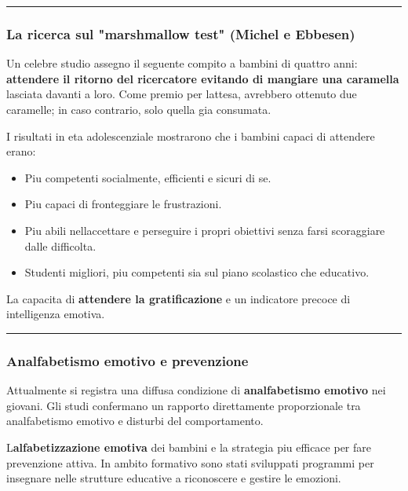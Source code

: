 \documentclass[a4paper,11pt]{article}
\providecommand{\tightlist}{%
  \setlength{\itemsep}{0pt}\setlength{\parskip}{0pt}}
\begin{document}
\begin{center}\rule{0.5\linewidth}{0.5pt}\end{center}

\subsubsection{La ricerca sul "marshmallow test" (Michel e
      Ebbesen)}\label{la-ricerca-sul-marshmallow-test-michel-e-ebbesen}

Un celebre studio assegno il seguente compito a bambini di quattro anni:
\textbf{attendere il ritorno del ricercatore evitando di mangiare una
      caramella} lasciata davanti a loro. Come premio per
l\textquotesingle attesa, avrebbero ottenuto due caramelle; in caso
contrario, solo quella gia consumata.

I risultati in eta adolescenziale mostrarono che i bambini capaci di
attendere erano:

\begin{itemize}
      \tightlist
      \item
            Piu competenti socialmente, efficienti e sicuri di se.
      \item
            Piu capaci di fronteggiare le frustrazioni.
      \item
            Piu abili nell\textquotesingle accettare e perseguire i propri
            obiettivi senza farsi scoraggiare dalle difficolta.
      \item
            Studenti migliori, piu competenti sia sul piano scolastico che
            educativo.
\end{itemize}

La capacita di \textbf{attendere la gratificazione} e un indicatore
precoce di intelligenza emotiva.

\begin{center}\rule{0.5\linewidth}{0.5pt}\end{center}

\subsubsection{Analfabetismo emotivo e
      prevenzione}\label{analfabetismo-emotivo-e-prevenzione}

Attualmente si registra una diffusa condizione di \textbf{analfabetismo
      emotivo} nei giovani. Gli studi confermano un rapporto direttamente
proporzionale tra analfabetismo emotivo e disturbi del comportamento.

L\textquotesingle{}\textbf{alfabetizzazione emotiva} dei bambini e la
strategia piu efficace per fare prevenzione attiva. In ambito formativo
sono stati sviluppati programmi per insegnare nelle strutture educative
a riconoscere e gestire le emozioni.
\end{document}
